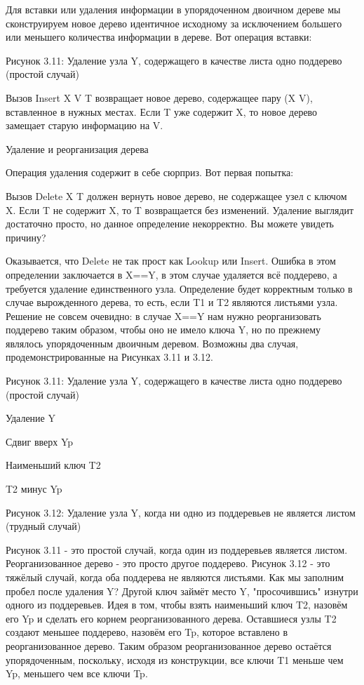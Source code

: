 Для вставки или удаления информации в упорядоченном двоичном дереве мы сконструируем новое дерево идентичное исходному за исключением большего или меньшего количества информации в дереве. Вот операция вставки:

Рисунок 3.11: Удаление узла Y, содержащего в качестве листа одно поддерево (простой случай)

Вызов {Insert X V T} возвращает новое дерево, содержащее пару (X V), вставленное в нужных местах. Если T уже содержит X, то новое дерево замещает старую информацию на V.

Удаление и реорганизация дерева

Операция удаления содержит в себе сюрприз. Вот первая попытка:

Вызов {Delete X T} должен вернуть новое дерево, не содержащее узел с ключом X. Если T не содержит X, то T возвращается без изменений. Удаление выглядит достаточно просто, но данное определение некорректно. Вы можете увидеть причину?

Оказывается, что Delete не так прост как Lookup или Insert. Ошибка в этом определении заключается в X==Y, в этом случае удаляется всё поддерево, а требуется удаление единственного узла. Определение будет корректным только в случае вырожденного дерева, то есть, если T1 и T2 являются листьями узла. Решение не совсем очевидно: в случае X==Y нам нужно реорганизовать поддерево таким образом, чтобы оно не имело ключа Y, но по прежнему являлось упорядоченным двоичным деревом. Возможны два случая, продемонстрированные на Рисунках 3.11 и 3.12.

Рисунок 3.11: Удаление узла Y, содержащего в качестве листа одно поддерево (простой случай)

Удаление Y

Сдвиг вверх Yp

Наименьший ключ T2

T2 минус Yp

Рисунок 3.12: Удаление узла Y, когда ни одно из поддеревьев не является листом (трудный случай)

Рисунок 3.11 - это простой случай, когда один из поддеревьев является листом. Реорганизованное дерево - это просто другое поддерево. Рисунок 3.12 - это тяжёлый случай, когда оба поддерева не являются листьями. Как мы заполним пробел после удаления Y? Другой ключ займёт место Y, "просочившись" изнутри одного из поддеревьев. Идея в том, чтобы взять наименьший ключ T2, назовём его Yp и сделать его корнем реорганизованного дерева. Оставшиеся узлы T2 создают меньшее поддерево, назовём его Tp, которое вставлено в реорганизованное дерево. Таким образом реорганизованное дерево остаётся упорядоченным, поскольку, исходя из конструкции, все ключи T1 меньше чем Yp, меньшего чем все ключи Tp.

